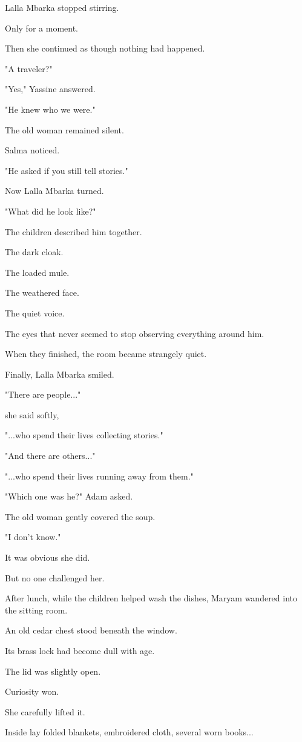 \documentclass[12pt,openany]{book}
\begin{document}
Lalla Mbarka stopped stirring.

Only for a moment.

Then she continued as though nothing had happened.

"A traveler?"

"Yes," Yassine answered.

"He knew who we were."

The old woman remained silent.

Salma noticed.

"He asked if you still tell stories."

Now Lalla Mbarka turned.

"What did he look like?"

The children described him together.

The dark cloak.

The loaded mule.

The weathered face.

The quiet voice.

The eyes that never seemed to stop observing everything around him.

When they finished, the room became strangely quiet.

Finally, Lalla Mbarka smiled.

"There are people..."

she said softly,

"...who spend their lives collecting stories."

"And there are others..."

"...who spend their lives running away from them."

"Which one was he?" Adam asked.

The old woman gently covered the soup.

"I don't know."

It was obvious she did.

But no one challenged her.

After lunch, while the children helped wash the dishes, Maryam wandered into the sitting room.

An old cedar chest stood beneath the window.

Its brass lock had become dull with age.

The lid was slightly open.

Curiosity won.

She carefully lifted it.

Inside lay folded blankets, embroidered cloth, several worn books...
\end{document}
